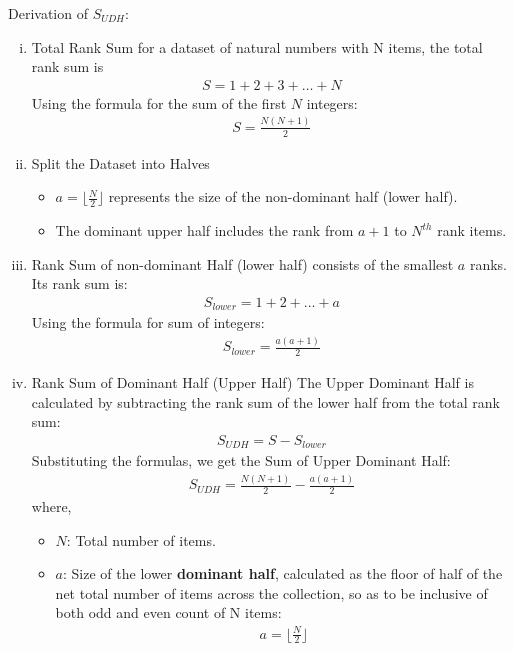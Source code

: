 \documentclass[a4paper,fleqn,review]{cas-sc}
\begin{document}
Derivation of $S_{UDH}$:
\begin{enumerate}[i.]
\item{
	Total Rank Sum for a dataset of natural numbers with N items, the total rank sum is
	\begin{align*}
		S = 1 + 2 + 3 + \ldots + N
	\end{align*}
	Using the formula for the sum of the first \( N \) integers:
	\begin{align*}
		S = \frac{N(N + 1)}{2}
	\end{align*}
}

\item{
	Split the Dataset into Halves
	\begin{itemize}
	  \item \( a = \lfloor \frac{N}{2} \rfloor \) represents the size of the non-dominant half (lower half).
	  \item The dominant upper half includes the rank from \( a + 1 \) to \(N^{th}\) rank items.
	\end{itemize}
}

\item{Rank Sum of non-dominant Half (lower half) consists of the smallest \( a \) ranks. Its rank sum is:
	\begin{align*}
		S_{lower} = 1 + 2 + \ldots + a
	\end{align*}
	Using the formula for sum of integers:
	\begin{align*}
		S_{lower} = \frac{a(a+1)}{2}
	\end{align*}
}

\item{Rank Sum of Dominant Half (Upper Half)
	The Upper Dominant Half is calculated by subtracting the rank sum of the lower half from the total rank sum:
	\begin{align*}
	S_{UDH} = S - S_{lower}
	\end{align*}
	Substituting the formulas, we get the Sum of Upper Dominant Half:
	\begin{align*}
	S_{UDH} = \frac{N(N + 1)}{2} - \frac{a(a+1)}{2}
	\end{align*}
}
where,
\begin{itemize}
  \item[] \( N \): Total number of items.
  \item[] \( a \): Size of the lower \textbf{dominant half}, calculated as the floor of half of the net total number of items across the collection, so as to be inclusive of both odd and even count of N items:
  \begin{align*}
  a = \lfloor \frac{N}{2} \rfloor
  \end{align*}
\end{itemize}
\end{enumerate}
\end{document}
